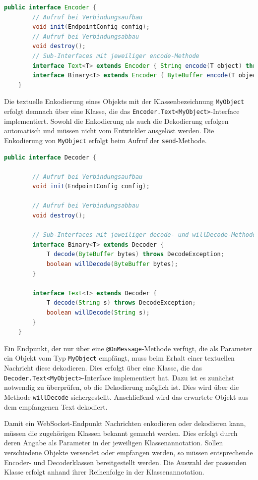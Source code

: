 \documentclass[11pt,a4paper,titlepage]{scrartcl}
\numberwithin{equation}{section}
\begin{document}
\begin{lstlisting}[frame=single, language=Java, caption=Java: Encoder-Interface]
	public interface Encoder {
		// Aufruf bei Verbindungsaufbau
		void init(EndpointConfig config);
		// Aufruf bei Verbindungsabbau
		void destroy();
		// Sub-Interfaces mit jeweiliger encode-Methode
		interface Text<T> extends Encoder { String encode(T object) throws EncodeException; }
		interface Binary<T> extends Encoder { ByteBuffer encode(T object) throws EncodeException; }
	}
\end{lstlisting}

\noindent Die textuelle Enkodierung eines Objekts mit der Klassenbezeichnung \texttt{MyObject} erfolgt demnach über eine Klasse, die das \texttt{Encoder.Text<MyObject>}-Interface implementiert. Sowohl die Enkodierung als auch die Dekodierung erfolgen automatisch und müssen nicht vom Entwickler ausgelöst werden. Die Enkodierung von \texttt{MyObject} erfolgt beim Aufruf der \texttt{send}-Methode. \medskip

\begin{lstlisting}[frame=single, language=Java, caption=Java: Decoder-Interface]
	public interface Decoder {
	
		// Aufruf bei Verbindungsaufbau
		void init(EndpointConfig config);
		
		// Aufruf bei Verbindungsabbau
		void destroy();
		
		// Sub-Interfaces mit jeweiliger decode- und willDecode-Methode
		interface Binary<T> extends Decoder {
			T decode(ByteBuffer bytes) throws DecodeException;
			boolean willDecode(ByteBuffer bytes);
		}
		
		interface Text<T> extends Decoder {
			T decode(String s) throws DecodeException;
			boolean willDecode(String s);
		}
	}
\end{lstlisting}

\noindent Ein Endpunkt, der nur über eine \texttt{@OnMessage}-Methode verfügt, die als Parameter ein Objekt vom Typ \texttt{MyObject} empfängt, muss beim Erhalt einer textuellen Nachricht diese dekodieren. Dies erfolgt über eine Klasse, die das \texttt{Decoder.Text<MyObject>}-Interface implementiert hat. Dazu ist es zunächst notwendig zu überprüfen, ob die Dekodierung möglich ist. Dies wird über die Methode \texttt{willDecode} sichergestellt. Anschließend wird das erwartete Objekt aus dem empfangenen Text dekodiert.\medskip

\noindent Damit ein WebSocket-Endpunkt Nachrichten enkodieren oder dekodieren kann, müssen die zugehörigen Klassen bekannt gemacht werden. Dies erfolgt durch deren Angabe als Parameter in der jeweiligen Klassenannotation. Sollen verschiedene Objekte versendet oder empfangen werden, so müssen entsprechende Encoder- und Decoderklassen bereitgestellt werden. Die Auswahl der passenden Klasse erfolgt anhand ihrer Reihenfolge in der Klassenannotation.\medskip
\end{document}

